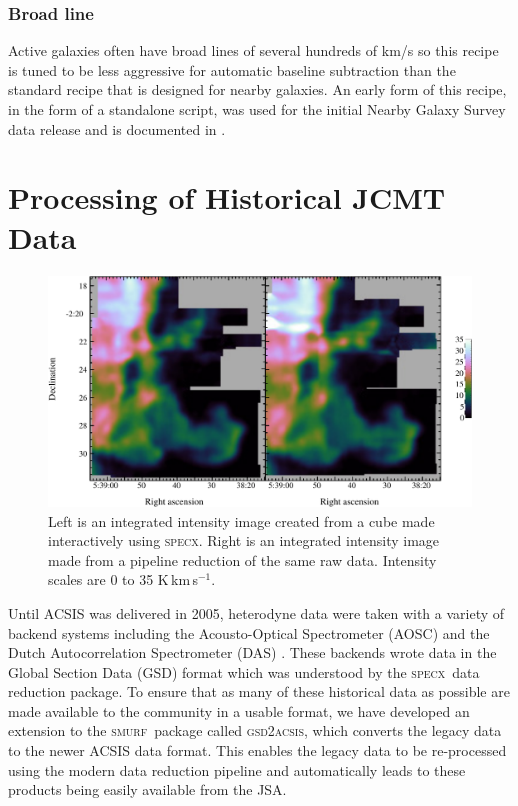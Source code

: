\documentclass[a4paper,fleqn,usenatbib]{mnras}
\newcommand{\specx}{\textsc{specx}}
\newcommand{\smurf}{\textsc{smurf}}
\newcommand{\gsdacsis}{\textsc{gsd{\footnotesize{2}}acsis}}
\begin{document}
\subsubsection{Broad line}

Active galaxies often have broad lines of several hundreds of km/s so
this recipe is tuned to be less aggressive for automatic baseline
subtraction than the standard recipe that is designed for nearby galaxies.
An early form of this recipe, in the form of a standalone script, was used
for the initial Nearby Galaxy Survey data release and is documented in
\citet{2010ApJ...714..571W}.

\section{Processing of Historical JCMT Data}

\begin{figure}
\centering
\includegraphics[width=\textwidth]{horsehead}
\caption{Left is an integrated intensity image created from
  a cube made interactively using \specx. Right is an
  integrated intensity image made from a pipeline reduction of the
  same raw data. Intensity scales are 0 to 35 K\,km\,s$^{-1}$.}
\label{fig:hhcmp}
\end{figure}

Until ACSIS was delivered in 2005, heterodyne data were taken with a
variety of backend systems including the Acousto-Optical Spectrometer
(AOSC) and the Dutch Autocorrelation Spectrometer (DAS)
\citep{1986SPIE..598..134B}. These backends wrote data in the
Global Section Data (GSD) format \citep[e.g.,][]{GSD1999,GSD2015} which was
understood by the \specx\ data reduction package. To ensure that as many
of these historical data as possible are made available to the community
in a usable format, we have developed an extension to the \smurf\
package called \gsdacsis, which converts the legacy data to the
newer ACSIS data format. This enables the legacy data to be re-processed using
the modern data reduction pipeline and automatically leads to these
products being easily available from the JSA.
\end{document}
